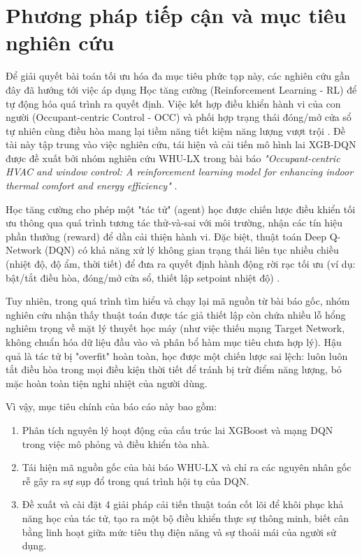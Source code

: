 \documentclass[12pt, a4paper]{report}
\begin{document}
\section{Phương pháp tiếp cận và mục tiêu nghiên cứu}
Để giải quyết bài toán tối ưu hóa đa mục tiêu phức tạp này, các nghiên cứu gần đây đã hướng tới việc áp dụng Học tăng cường (Reinforcement Learning - RL) để tự động hóa quá trình ra quyết định. Việc kết hợp điều khiển hành vi của con người (Occupant-centric Control - OCC) và phối hợp trạng thái đóng/mở cửa sổ tự nhiên cùng điều hòa mang lại tiềm năng tiết kiệm năng lượng vượt trội \cite{whulx}. Đề tài này tập trung vào việc nghiên cứu, tái hiện và cải tiến mô hình lai XGB-DQN được đề xuất bởi nhóm nghiên cứu WHU-LX trong bài báo \textit{"Occupant-centric HVAC and window control: A reinforcement learning model for enhancing indoor thermal comfort and energy efficiency"} \cite{whulx}. 

Học tăng cường cho phép một "tác tử" (agent) học được chiến lược điều khiển tối ưu thông qua quá trình tương tác thử-và-sai với môi trường, nhận các tín hiệu phần thưởng (reward) để dần cải thiện hành vi. Đặc biệt, thuật toán Deep Q-Network (DQN) có khả năng xử lý không gian trạng thái liên tục nhiều chiều (nhiệt độ, độ ẩm, thời tiết) để đưa ra quyết định hành động rời rạc tối ưu (ví dụ: bật/tắt điều hòa, đóng/mở cửa sổ, thiết lập setpoint nhiệt độ) \cite{dqn}.

Tuy nhiên, trong quá trình tìm hiểu và chạy lại mã nguồn từ bài báo gốc, nhóm nghiên cứu nhận thấy thuật toán được tác giả thiết lập còn chứa nhiều lỗ hổng nghiêm trọng về mặt lý thuyết học máy (như việc thiếu mạng Target Network, không chuẩn hóa dữ liệu đầu vào và phân bổ hàm mục tiêu chưa hợp lý). Hậu quả là tác tử bị "overfit" hoàn toàn, học được một chiến lược sai lệch: luôn luôn tắt điều hòa trong mọi điều kiện thời tiết để tránh bị trừ điểm năng lượng, bỏ mặc hoàn toàn tiện nghi nhiệt của người dùng.

Vì vậy, mục tiêu chính của báo cáo này bao gồm:
\begin{enumerate}
    \item Phân tích nguyên lý hoạt động của cấu trúc lai XGBoost và mạng DQN trong việc mô phỏng và điều khiển tòa nhà.
    \item Tái hiện mã nguồn gốc của bài báo WHU-LX và chỉ ra các nguyên nhân gốc rễ gây ra sự sụp đổ trong quá trình hội tụ của DQN.
    \item Đề xuất và cài đặt 4 giải pháp cải tiến thuật toán cốt lõi để khôi phục khả năng học của tác tử, tạo ra một bộ điều khiển thực sự thông minh, biết cân bằng linh hoạt giữa mức tiêu thụ điện năng và sự thoải mái của người sử dụng.
\end{enumerate}
\end{document}
